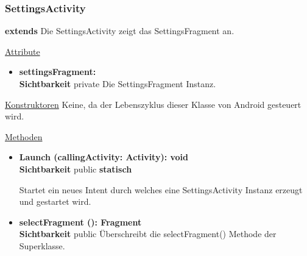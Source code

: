 \subsubsection{SettingsActivity} \label{app:klasse:SettingsActivity}
\textbf{extends}  \newline
Die SettingsActivity zeigt das SettingsFragment an.
\newline

\underline{Attribute}
\begin{itemize}
\itemsep0pt
\item \textbf{settingsFragment: } \hfill\\ 
\textbf{Sichtbarkeit} private\newline
Die SettingsFragment Instanz.

\end{itemize}

\underline{Konstruktoren}\newline
\indent Keine, da der Lebenszyklus dieser Klasse von Android gesteuert wird.\newline

\underline{Methoden}
\begin{itemize}
\itemsep0pt

\item \textbf{Launch (callingActivity: Activity): void}\hfill\\
\textbf{Sichtbarkeit} public \newline
\textbf{statisch} 

Startet ein neues Intent durch welches eine SettingsActivity Instanz erzeugt und gestartet wird.

\item \textbf{selectFragment (): Fragment}\hfill\\
\textbf{Sichtbarkeit} public\newline
Überschreibt die selectFragment() Methode der Superklasse.

\end{itemize}
